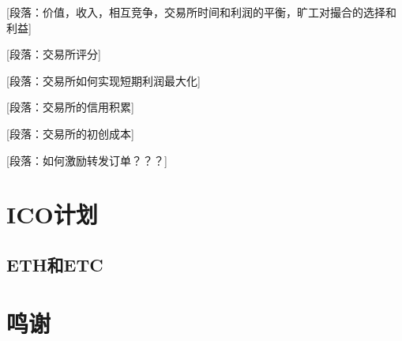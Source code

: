 \documentclass[UTF8,nofonts]{ctexart}
\begin{document}
[段落：价值，收入，相互竞争，交易所时间和利润的平衡，旷工对撮合的选择和利益]

[段落：交易所评分]

[段落：交易所如何实现短期利润最大化]

[段落：交易所的信用积累]

[段落：交易所的初创成本]


[段落：如何激励转发订单？？？]


\section{ICO计划\label{sec:ico}}

\subsection{ETH和ETC\label{sec:chains}}

\section{鸣谢\label{sec:acknowledgement}}



\end{document}
